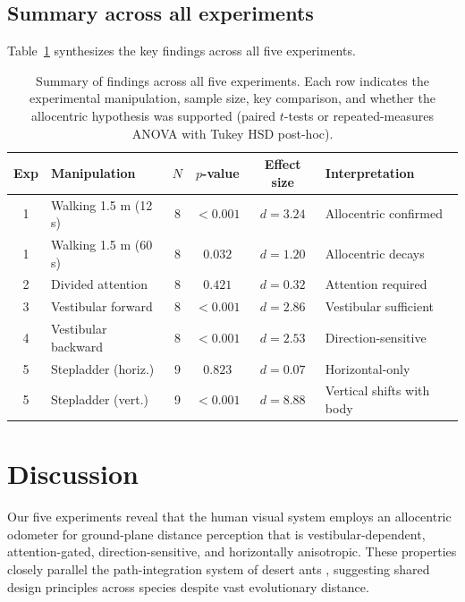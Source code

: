 \documentclass[11pt]{article}
\begin{document}
\subsection{Summary across all experiments}

Table~\ref{tab:summary_all} synthesizes the key findings across all five experiments.

\begin{table}[H]
\centering
\caption{Summary of findings across all five experiments. Each row indicates the experimental manipulation, sample size, key comparison, and whether the allocentric hypothesis was supported (paired $t$-tests or repeated-measures ANOVA with Tukey HSD post-hoc).}
\label{tab:summary_all}
\begin{tabular}{clcccl}
\toprule
\textbf{Exp} & \textbf{Manipulation} & \textbf{$N$} & \textbf{$p$-value} & \textbf{Effect size} & \textbf{Interpretation} \\
\midrule
1 & Walking 1.5 m (12 s) & 8 & $< 0.001$ & $d = 3.24$ & Allocentric confirmed \\
1 & Walking 1.5 m (60 s) & 8 & $0.032$ & $d = 1.20$ & Allocentric decays \\
2 & Divided attention & 8 & $0.421$ & $d = 0.32$ & Attention required \\
3 & Vestibular forward & 8 & $< 0.001$ & $d = 2.86$ & Vestibular sufficient \\
4 & Vestibular backward & 8 & $< 0.001$ & $d = 2.53$ & Direction-sensitive \\
5 & Stepladder (horiz.) & 9 & $0.823$ & $d = 0.07$ & Horizontal-only \\
5 & Stepladder (vert.) & 9 & $< 0.001$ & $d = 8.88$ & Vertical shifts with body \\
\bottomrule
\end{tabular}
\end{table}

\section{Discussion}

Our five experiments reveal that the human visual system employs an allocentric odometer for ground-plane distance perception that is vestibular-dependent, attention-gated, direction-sensitive, and horizontally anisotropic. These properties closely parallel the path-integration system of desert ants \citep{muller2011, wehner2003}, suggesting shared design principles across species despite vast evolutionary distance.
\end{document}
